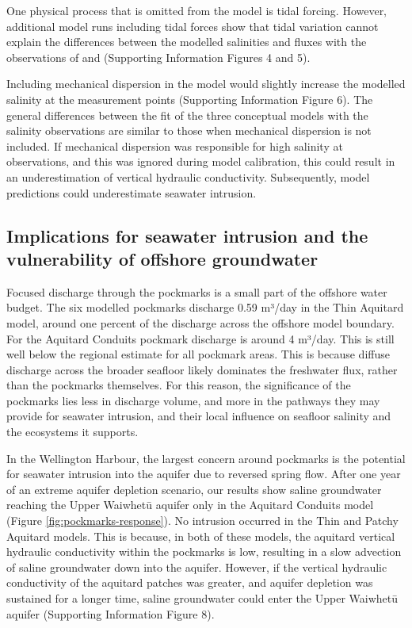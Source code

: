 \documentclass[pdflatex,sn-apa]{sn-jnl}%
\begin{document}
One physical process that is omitted from the model is tidal forcing.
However, additional model runs including tidal forces show that tidal variation cannot explain the differences between the modelled salinities and fluxes with the observations of \cite{hoffmann_fresh_2023} and \cite{harding_characteristics_2000} (Supporting Information Figures 4 and 5).

Including mechanical dispersion in the model would slightly increase the modelled salinity at the measurement points (Supporting Information Figure 6).
The general differences between the fit of the three conceptual models with the salinity observations are similar to those when mechanical dispersion is not included.
If mechanical dispersion was responsible for high salinity at observations, and this was ignored during model calibration,
this could result in an underestimation of vertical hydraulic conductivity. Subsequently, model predictions could underestimate seawater intrusion.

\subsection{Implications for seawater intrusion and the vulnerability of offshore groundwater}

Focused discharge through the pockmarks is a small part of the offshore water budget.
The six modelled pockmarks discharge 0.59 m³/day in the Thin Aquitard model, around one percent of the discharge across the offshore model boundary.
For the Aquitard Conduits pockmark discharge is around 4 m³/day.
This is still well below the regional estimate for all pockmark areas.
This is because diffuse discharge across the broader seafloor likely dominates the freshwater flux, rather than the pockmarks themselves.
For this reason, the significance of the pockmarks lies less in discharge volume, and more in the pathways they may provide for seawater intrusion, and their local influence on seafloor salinity and the ecosystems it supports.

In the Wellington Harbour, the largest concern around pockmarks is the potential for seawater intrusion into the aquifer due to reversed spring flow.
After one year of an extreme aquifer depletion scenario, our results show saline groundwater reaching the Upper Waiwhetū aquifer only in the Aquitard Conduits model (Figure \ref{fig:pockmarks-response}).
No intrusion occurred in the Thin and Patchy Aquitard models.
This is because, in both of these models, the aquitard vertical hydraulic conductivity within the pockmarks is low,
resulting in a slow advection of saline groundwater down into the aquifer.
However, if the vertical hydraulic conductivity of the aquitard patches was greater, and aquifer depletion was sustained for a longer time, saline groundwater could enter the Upper Waiwhetū aquifer (Supporting Information Figure 8).
\end{document}
